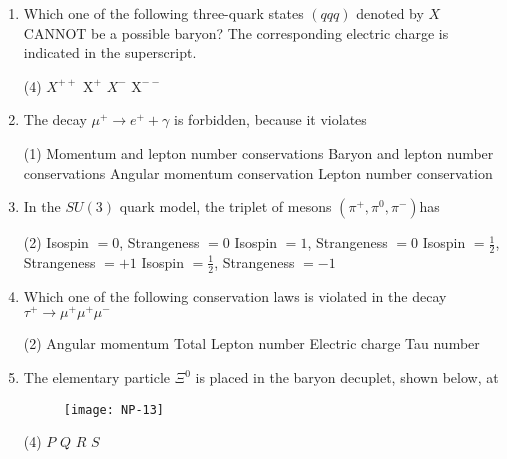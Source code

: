 \begin{enumerate}
	\item  Which one of the following three-quark states $(q q q)$ denoted by $X$ CANNOT be a possible baryon? The corresponding electric charge is indicated in the superscript.
	{}
	 \begin{tasks}(4)
		\task[\textbf{a.}]$X^{++}$
		\task[\textbf{b.}]$\mathrm{X}^{+}$
		\task[\textbf{c.}]$X^{-}$
		\task[\textbf{d.}] $\mathrm{X}^{--}$ 
	\end{tasks}

	\item  The decay $\mu^{+} \rightarrow e^{+}+\gamma$ is forbidden, because it violates
	{}
	 \begin{tasks}(1)
		\task[\textbf{a.}] Momentum and lepton number conservations
		\task[\textbf{b.}]Baryon and lepton number conservations
		\task[\textbf{c.}]Angular momentum conservation
		\task[\textbf{d.}]  Lepton number conservation
	\end{tasks}

	\item  In the $S U(3)$ quark model, the triplet of mesons $\left(\pi^{+}, \pi^0, \pi^{-}\right)$has
	{}
	 \begin{tasks}(2)
		\task[\textbf{a.}]Isospin $=0$, Strangeness $=0$
		\task[\textbf{b.}] Isospin $=1$, Strangeness $=0$
		\task[\textbf{c.}]Isospin $=\frac{1}{2}$, Strangeness $=+1$
		\task[\textbf{d.}]  Isospin $=\frac{1}{2}$, Strangeness $=-1$
	\end{tasks}

	\item  Which one of the following conservation laws is violated in the decay $\tau^{+} \rightarrow \mu^{+} \mu^{+} \mu^{-}$
	{}
	 \begin{tasks}(2)
		\task[\textbf{a.}]Angular momentum
		\task[\textbf{b.}]Total Lepton number
		\task[\textbf{c.}]Electric charge
		\task[\textbf{d.}]Tau number 
	\end{tasks}

	\item  The elementary particle $\Xi^0$ is placed in the baryon decuplet, shown below, at
		{}
	\begin{figure}[H]
		\centering
		\texttt{[image: NP-13]}
	\end{figure}
	 \begin{tasks}(4)
		\task[\textbf{a.}]$P$
		\task[\textbf{b.}]$Q$
		\task[\textbf{c.}]$R$
		\task[\textbf{d.}] $S$ 
	\end{tasks}


\end{enumerate}
